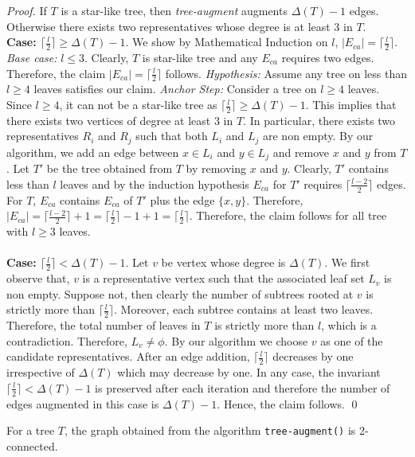 \documentclass[runningheads]{llncs}
\begin{document}
\begin{proof}
If $T$ is a star-like tree, then {\em tree-augment} augments $\Delta(T)-1$ edges.  Otherwise there exists two representatives whose degree is at least 3 in $T$. \\
{\bf Case: $\lceil\frac{l}{2}\rceil \geq \Delta(T)-1$}.  We show by Mathematical Induction on $l$, $|E_{ca}|= \lceil\frac{l}{2}\rceil$.  {\em Base case:} $l \leq 3$.  Clearly, $T$ is star-like tree and any $E_{ca}$ requires two edges.  Therefore, the claim $|E_{ca}|=\lceil\frac{l}{2}\rceil$ follows. {\em Hypothesis:} Assume any tree on less than $l \geq 4$ leaves satisfies our claim. {\em Anchor Step:} Consider a tree on $l \geq 4$ leaves.  Since $l \geq 4$, it can not be a star-like tree as $\lceil\frac{l}{2}\rceil \geq \Delta(T)-1$.  This implies that there exists two vertices of degree at least 3 in $T$.  In particular, there exists two representatives $R_i$ and $R_j$ such that both $L_i$ and $L_j$ are non empty.  By our algorithm, we add an edge between $x \in L_i$ and $y \in L_j$ and remove $x$ and $y$ from $T$.  Let $T'$ be the tree obtained from $T$ by removing $x$ and $y$.  Clearly, $T'$ contains less than $l$ leaves and by the induction hypothesis $E_{ca}$ for $T'$ requires $\lceil\frac{l-2}{2}\rceil$ edges.  For $T$, $E_{ca}$ contains $E_{ca}$ of $T'$ plus the edge $\{x,y\}$.  Therefore, $|E_{ca}|= \lceil\frac{l-2}{2}\rceil +1 = \lceil\frac{l}{2}\rceil - 1 + 1 = \lceil\frac{l}{2}\rceil$.  Therefore, the claim follows for all tree with $l \geq 3 $ leaves. \\ \\
{\bf Case: $\lceil\frac{l}{2}\rceil < \Delta(T)-1$}.  Let $v$ be vertex whose degree is $\Delta(T)$.  We first observe that, $v$ is a representative vertex such that the associated leaf set $L_v$ is non empty.  Suppose not, then clearly the number of subtrees rooted at $v$ is strictly more than $\lceil\frac{l}{2}\rceil$.  Moreover, each subtree contains at least two leaves.  Therefore, the total number of leaves in $T$ is  strictly more than $l$, which is a contradiction.  Therefore, $L_v \not= \phi$.  By our algorithm we choose $v$ as one of the candidate representatives.  After an edge addition,  $\lceil\frac{l}{2}\rceil$ decreases by one irrespective of $\Delta(T)$ which may decrease by one.  In any case, the invariant  $\lceil\frac{l}{2}\rceil < \Delta(T)-1$ is preserved after each iteration and therefore the number of edges augmented in this case is  $\Delta(T)-1$.  Hence, the claim follows. \qed
\end{proof}
\begin{theorem}
For a tree $T$, the graph obtained from the algorithm {\tt tree-augment()} is 2-connected.
\end{theorem}
\end{document}
